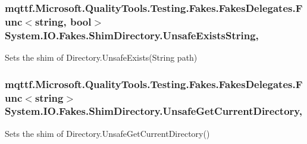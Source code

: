 \hypertarget{class_system_1_1_i_o_1_1_fakes_1_1_shim_directory_ad631d0953e32ff3264fee4a1fcec170f}{
\subsubsection[{Unsafe\-Exists\-String}]{\setlength{\rightskip}{0pt plus 5cm}mqttf.\-Microsoft.\-Quality\-Tools.\-Testing.\-Fakes.\-Fakes\-Delegates.\-Func$<$string, bool$>$ System.\-I\-O.\-Fakes.\-Shim\-Directory.\-Unsafe\-Exists\-String\hspace{0.3cm}{\ttfamily [static]}, {\ttfamily [set]}}}\label{class_system_1_1_i_o_1_1_fakes_1_1_shim_directory_ad631d0953e32ff3264fee4a1fcec170f}


Sets the shim of Directory.\-Unsafe\-Exists(\-String path)

\hypertarget{class_system_1_1_i_o_1_1_fakes_1_1_shim_directory_a65b5aff758d109f748ee2839608bed01}{
\subsubsection[{Unsafe\-Get\-Current\-Directory}]{\setlength{\rightskip}{0pt plus 5cm}mqttf.\-Microsoft.\-Quality\-Tools.\-Testing.\-Fakes.\-Fakes\-Delegates.\-Func$<$string$>$ System.\-I\-O.\-Fakes.\-Shim\-Directory.\-Unsafe\-Get\-Current\-Directory\hspace{0.3cm}{\ttfamily [static]}, {\ttfamily [set]}}}\label{class_system_1_1_i_o_1_1_fakes_1_1_shim_directory_a65b5aff758d109f748ee2839608bed01}


Sets the shim of Directory.\-Unsafe\-Get\-Current\-Directory()


